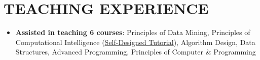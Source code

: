 \section{TEACHING EXPERIENCE}
{

}

\vspace{2mm}

\begin{itemize}
    \item \textbf{Assisted in teaching 6 courses}: Principles of Data Mining, Principles of Computational Intelligence (\href{https://github.com/Computational-Intelligence-Fall18/Computational-Intelligence-Tutorials}{Self-Designed Tutorial}), Algorithm Design, Data Structures, Advanced Programming, Principles of Computer \& Programming
\end{itemize}
